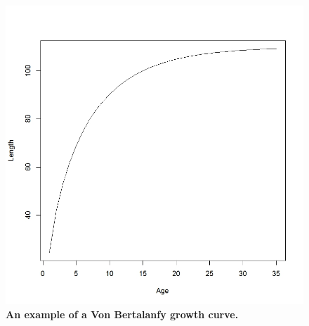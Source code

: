 \begin{figure}[htp]
			 \includegraphics[scale=0.4]{Figures/VonBert.jpeg}
			 \caption{\textbf{An example of a Von Bertalanfy growth curve.}}
\end{figure}



